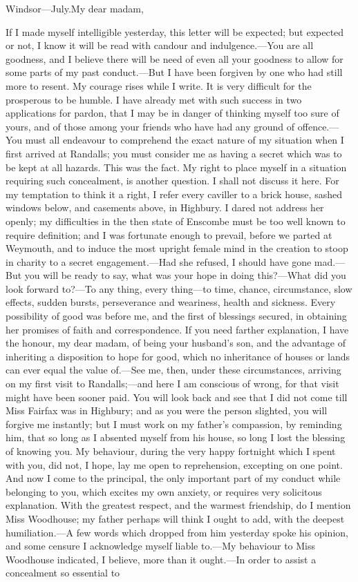 \begin{mail}{Windsor—July.}{My dear madam,}

If I made myself intelligible yesterday, this letter will be expected; but expected or not, I know it will be read with candour and indulgence.—You are all goodness, and I believe there will be need of even all your goodness to allow for some parts of my past conduct.—But I have been forgiven by one who had still more to resent. My courage rises while I write. It is very difficult for the prosperous to be humble. I have already met with such success in two applications for pardon, that I may be in danger of thinking myself too sure of yours, and of those among your friends who have had any ground of offence.—You must all endeavour to comprehend the exact nature of my situation when I first arrived at Randalls; you must consider me as having a secret which was to be kept at all hazards. This was the fact. My right to place myself in a situation requiring such concealment, is another question. I shall not discuss it here. For my temptation to think it a right, I refer every caviller to a brick house, sashed windows below, and casements above, in Highbury. I dared not address her openly; my difficulties in the then state of Enscombe must be too well known to require definition; and I was fortunate enough to prevail, before we parted at Weymouth, and to induce the most upright female mind in the creation to stoop in charity to a secret engagement.—Had she refused, I should have gone mad.—But you will be ready to say, what was your hope in doing this?—What did you look forward to?—To any thing, every thing—to time, chance, circumstance, slow effects, sudden bursts, perseverance and weariness, health and sickness. Every possibility of good was before me, and the first of blessings secured, in obtaining her promises of faith and correspondence. If you need farther explanation, I have the honour, my dear madam, of being your husband's son, and the advantage of inheriting a disposition to hope for good, which no inheritance of houses or lands can ever equal the value of.—See me, then, under these circumstances, arriving on my first visit to Randalls;—and here I am conscious of wrong, for that visit might have been sooner paid. You will look back and see that I did not come till Miss Fairfax was in Highbury; and as you were the person slighted, you will forgive me instantly; but I must work on my father's compassion, by reminding him, that so long as I absented myself from his house, so long I lost the blessing of knowing you. My behaviour, during the very happy fortnight which I spent with you, did not, I hope, lay me open to reprehension, excepting on one point. And now I come to the principal, the only important part of my conduct while belonging to you, which excites my own anxiety, or requires very solicitous explanation. With the greatest respect, and the warmest friendship, do I mention Miss Woodhouse; my father perhaps will think I ought to add, with the deepest humiliation.—A few words which dropped from him yesterday spoke his opinion, and some censure I acknowledge myself liable to.—My behaviour to Miss Woodhouse indicated, I believe, more than it ought.—In order to assist a concealment so essential to 
\end{mail}
